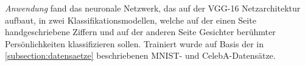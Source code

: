 \textit{Anwendung} fand das neuronale Netzwerk, das auf der VGG-16 Netzarchitektur aufbaut, in zwei Klassifikationsmodellen, welche auf der einen Seite handgeschriebene Ziffern und auf der anderen Seite Gesichter berühmter Persönlichkeiten klassifizieren sollen. Trainiert wurde auf Basis der in \ref{subsection:datensaetze} beschriebenen MNIST- und CelebA-Datensätze.


\begin{table}[h]
	\centering
	\renewcommand{\arraystretch}{1.5}
	\caption{Hyperparameter des \glqq normalen\grqq{} Trainings bezüglich der angegebenen Datensätze}
	\label{tab:nn_train}
\end{table}

